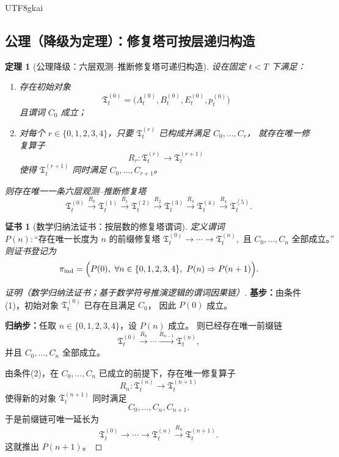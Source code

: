 \documentclass[12pt]{article}
\newtheorem{theorem}{定理}[section]
\newtheorem{Certificate}{证书}[section]
\begin{document}
\begin{CJK*}{UTF8}{gkai}
\subsection{公理（降级为定理）：修复塔可按层递归构造}
\label{subsec:tex1-ch1-axiom-downgrade}

\begin{theorem}[公理降级：六层观测--推断修复塔可递归构造]
\label{thm:tex1-axiom-downgrade}
设在固定 $t<T$ 下满足：
\begin{enumerate}
  \item 存在初始对象
  \[
    \mathfrak T_t^{(0)}
    =
    \bigl(
      \Lambda_t^{(0)},
      B_t^{(0)},
      E_t^{(0)},
      p_t^{(0)}
    \bigr)
  \]
  且谓词 $C_0$ 成立；
  \item 对每个 $r\in\{0,1,2,3,4\}$，只要 $\mathfrak T_t^{(r)}$ 已构成并满足 $C_0,\dots,C_r$，
  就存在唯一修复算子
  \[
    R_r:\mathfrak T_t^{(r)}\to \mathfrak T_t^{(r+1)}
  \]
  使得 $\mathfrak T_t^{(r+1)}$ 同时满足 $C_0,\dots,C_{r+1}$。
\end{enumerate}
则存在唯一一条六层观测--推断修复塔
\[
  \mathfrak T_t^{(0)}
  \xrightarrow{R_0}
  \mathfrak T_t^{(1)}
  \xrightarrow{R_1}
  \mathfrak T_t^{(2)}
  \xrightarrow{R_2}
  \mathfrak T_t^{(3)}
  \xrightarrow{R_3}
  \mathfrak T_t^{(4)}
  \xrightarrow{R_4}
  \mathfrak T_t^{(5)}.
\]
\end{theorem}

\begin{Certificate}[数学归纳法证书：按层数的修复塔谓词]
\label{cert:tex1-axiom-downgrade}
定义谓词
\[
  P(n):
  \text{“存在唯一长度为 $n$ 的前缀修复塔 }
  \mathfrak T_t^{(0)}\to\cdots\to \mathfrak T_t^{(n)},
  \text{ 且 }C_0,\dots,C_n\text{ 全部成立。”}
\]
则证书登记为
\[
  \pi_{\mathrm{ind}}
  =
  \Bigl(
    P(0),\
    \forall n\in\{0,1,2,3,4\},\ P(n)\Rightarrow P(n+1)
  \Bigr).
\]
\end{Certificate}

\begin{proof}[证明（数学归纳法证书；基于数学符号推演逻辑的谓词因果链）]
\textbf{基步：}由条件(1)，初始对象 $\mathfrak T_t^{(0)}$ 已存在且满足 $C_0$，
因此 $P(0)$ 成立。

\textbf{归纳步：}任取 $n\in\{0,1,2,3,4\}$，设 $P(n)$ 成立。
则已经存在唯一前缀链
\[
  \mathfrak T_t^{(0)}
  \xrightarrow{R_0}
  \cdots
  \xrightarrow{R_{n-1}}
  \mathfrak T_t^{(n)},
\]
并且 $C_0,\dots,C_n$ 全部成立。

由条件(2)，在 $C_0,\dots,C_n$ 已成立的前提下，存在唯一修复算子
\[
  R_n:\mathfrak T_t^{(n)}\to \mathfrak T_t^{(n+1)}
\]
使得新的对象 $\mathfrak T_t^{(n+1)}$ 同时满足
\[
  C_0,\dots,C_n,C_{n+1}.
\]
于是前缀链可唯一延长为
\[
  \mathfrak T_t^{(0)}
  \to
  \cdots
  \to
  \mathfrak T_t^{(n)}
  \xrightarrow{R_n}
  \mathfrak T_t^{(n+1)}.
\]
这就推出 $P(n+1)$。


\end{proof}
\end{CJK*}
\end{document}
